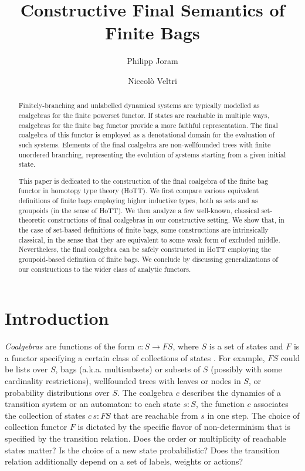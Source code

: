 \documentclass[final,a4paper,USenglish,cleveref]{lipics-v2021}
\title{Constructive Final Semantics of Finite Bags}
\author{Philipp Joram}%
  {Department of Software Science, Tallinn University of Technology, Estonia}
  {philipp@cs.ioc.ee}%
  {https://orcid.org/0000-0002-0448-7907}%
  {}
\author{Niccol{\`o} Veltri}%
  {Department of Software Science, Tallinn University of Technology, Estonia}
  {niccolo@cs.ioc.ee}%
  {https://orcid.org/0000-0002-7230-3436}%
  {}
\begin{document}
\maketitle

\begin{abstract}
  Finitely-branching and unlabelled dynamical systems are typically modelled as coalgebras for the finite powerset functor.
  If states are reachable in multiple ways, coalgebras for the finite bag functor provide a more faithful representation.
  The final coalgebra of this functor is employed as a denotational domain for the evaluation of such systems.
  Elements of the final coalgebra are non-wellfounded trees with finite unordered branching,
  representing the evolution of systems starting from a given initial state.

  This paper is dedicated to the construction of the final coalgebra of the finite bag functor in homotopy type theory (HoTT).
  We first compare various equivalent definitions of finite bags employing higher inductive types, both as sets and as groupoids (in the sense of HoTT).
  We then analyze a few well-known, classical set-theoretic constructions of final coalgebras in our constructive setting.
  We show that, in the case of set-based definitions of finite bags,
  some constructions are intrinsically classical, in the sense that they are equivalent to some weak form of excluded middle.
  Nevertheless, the final coalgebra can be safely constructed in HoTT employing the groupoid-based definition of finite bags.
  We conclude by discussing generalizations of our constructions to the wider class of analytic functors.

\end{abstract}

\setcounter{tocdepth}{1}

\section{Introduction}

\emph{Coalgebras} are functions of the form $c : S \to F S$, where $S$ is a set of states and $F$ is a functor specifying a certain class of collections of states \cite{Rutten2000,Jacobs2016}. For example, $F S$ could be lists over $S$, bags (a.k.a. multisubsets) or subsets of $S$ (possibly with some cardinality restrictions), wellfounded trees with leaves or nodes in $S$, or probability distributions over $S$. The coalgebra $c$ describes the dynamics of a transition system or an automaton: to each state $s : S$, the function $c$ associates the collection of states $c \,s : F S$ that are reachable from $s$ in one step. The choice of collection functor $F$ is dictated by the specific flavor of non-determinism that is specified by the transition relation. Does the order or multiplicity of reachable states matter? Is the choice of a new state probabilistic? Does the transition relation additionally depend on a set of labels, weights or actions?
\end{document}
